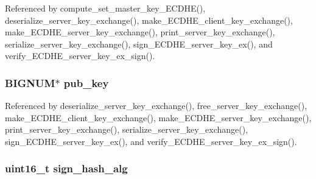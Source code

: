 Referenced by compute\+\_\+set\+\_\+master\+\_\+key\+\_\+\+E\+C\+D\+H\+E(), deserialize\+\_\+server\+\_\+key\+\_\+exchange(), make\+\_\+\+E\+C\+D\+H\+E\+\_\+client\+\_\+key\+\_\+exchange(), make\+\_\+\+E\+C\+D\+H\+E\+\_\+server\+\_\+key\+\_\+exchange(), print\+\_\+server\+\_\+key\+\_\+exchange(), serialize\+\_\+server\+\_\+key\+\_\+exchange(), sign\+\_\+\+E\+C\+D\+H\+E\+\_\+server\+\_\+key\+\_\+ex(), and verify\+\_\+\+E\+C\+D\+H\+E\+\_\+server\+\_\+key\+\_\+ex\+\_\+sign().

\subsubsection[{\texorpdfstring{pub\+\_\+key}{pub_key}}]{\setlength{\rightskip}{0pt plus 5cm}B\+I\+G\+N\+UM$\ast$ pub\+\_\+key}\hypertarget{structecdhe__server__key__exchange__t_aad713005343ebfb84e09a7441d655802}{}\label{structecdhe__server__key__exchange__t_aad713005343ebfb84e09a7441d655802}


Referenced by deserialize\+\_\+server\+\_\+key\+\_\+exchange(), free\+\_\+server\+\_\+key\+\_\+exchange(), make\+\_\+\+E\+C\+D\+H\+E\+\_\+client\+\_\+key\+\_\+exchange(), make\+\_\+\+E\+C\+D\+H\+E\+\_\+server\+\_\+key\+\_\+exchange(), print\+\_\+server\+\_\+key\+\_\+exchange(), serialize\+\_\+server\+\_\+key\+\_\+exchange(), sign\+\_\+\+E\+C\+D\+H\+E\+\_\+server\+\_\+key\+\_\+ex(), and verify\+\_\+\+E\+C\+D\+H\+E\+\_\+server\+\_\+key\+\_\+ex\+\_\+sign().

\subsubsection[{\texorpdfstring{sign\+\_\+hash\+\_\+alg}{sign_hash_alg}}]{\setlength{\rightskip}{0pt plus 5cm}uint16\+\_\+t sign\+\_\+hash\+\_\+alg}\hypertarget{structecdhe__server__key__exchange__t_a07ea01aadbb81f38a9a27e324d11f54e}{}\label{structecdhe__server__key__exchange__t_a07ea01aadbb81f38a9a27e324d11f54e}


